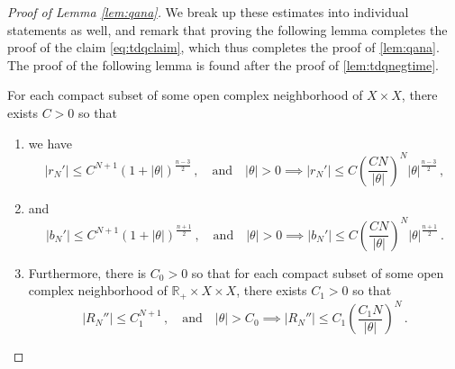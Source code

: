 \documentclass[
	fontsize=11pt, 
	twoside=false, 
	abstract=true, 
	a4paper,
]{scrartcl}
\newcommand{\RR}{\mathbb{R}}
\newcommand{\abs}[1]{\left\lvert#1\right\rvert}
\newcommand{\an}{\quad\text{and}\quad}
\begin{document}
\begin{proof}[Proof of Lemma \ref{lem:qana}]
	We break up these estimates into individual statements as well, and remark that proving the following lemma completes the proof of the claim \cref{eq:tdqclaim}, which thus completes the proof of \cref{lem:qana}. The proof of the following lemma is found after the proof of \cref{lem:tdqnegtime}.
	\begin{lemma}\label{lem:twostats}
		For each compact subset of some open complex neighborhood of $X\times X$, there exists $C>0$ so that
		\begin{enumerate}
		\item we have
		\begin{equation}\label{eq:estrN}
			\abs{r_N'} \leq C^{N+1}(1+\abs{\theta})^{\frac{n-3}{2}}\,,\an\abs{\theta}>0 \implies \abs{r_N'} \leq C\left(\frac{CN}{\abs{\theta}}\right)^N\abs{\theta}^{\frac{n-3}{2}}\,,
		\end{equation}
		\item and
		\begin{equation}\label{eq:estbN}
			\abs{b_N'} \leq C^{N+1}(1+\abs{\theta})^{\frac{n+1}{2}}\,,\an\abs{\theta}>0 \implies \abs{b_N'} \leq C\left(\frac{CN}{\abs{\theta}}\right)^N\abs{\theta}^{\frac{n+1}{2}}\,.
		\end{equation}
		\item Furthermore, there is $C_0>0$ so that for each compact subset of some open complex neighborhood of $\RR_+\times X\times X$, there exists $C_1>0$ so that 
		\begin{equation}\label{eq:estRNprime}
			\abs{R_N''} \leq C_1^{N+1}\,,\an\abs{\theta}>C_0 \implies \abs{R_N''} \leq C_1\left(\frac{C_1N}{\abs{\theta}}\right)^N\,.
		\end{equation}
		\end{enumerate}
	\end{lemma}
\end{proof}
\end{document}
